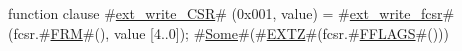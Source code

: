 function clause #\hyperref[sailRISCVzextzywritezyCSR]{ext\_write\_CSR}# (0x001, value) = { #\hyperref[sailRISCVzextzywritezyfcsr]{ext\_write\_fcsr}# (fcsr.#\hyperref[sailRISCVzFRM]{FRM}#(), value [4..0]); #\hyperref[sailRISCVzSome]{Some}#(#\hyperref[sailRISCVzEXTZ]{EXTZ}#(fcsr.#\hyperref[sailRISCVzFFLAGS]{FFLAGS}#())) }
